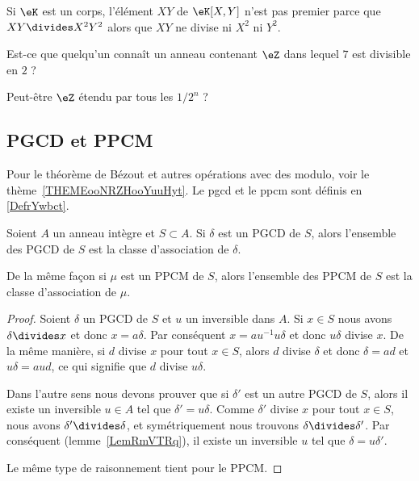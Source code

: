 \begin{example}
	Si \( \eK\) est un corps, l'élément \( XY\) de \( \eK[X,Y]\) n'est pas premier parce que \( XY\divides X^2Y^2\) alors que \( XY\) ne divise ni \( X^2\) ni \( Y^2\).
\end{example}

\begin{probleme}
	Est-ce que quelqu'un connaît un anneau contenant \( \eZ\) dans lequel \( 7\) est divisible en \( 2\) ?

	Peut-être \( \eZ\) étendu par tous les \( 1/2^n\) ?
\end{probleme}

\subsection{PGCD et PPCM}

Pour le théorème de Bézout et autres opérations avec des modulo, voir le thème~\ref{THEMEooNRZHooYuuHyt}. Le pgcd et le ppcm sont définis en \ref{DefrYwbct}.

\begin{lemma}
	Soient \( A\) un anneau intègre et \( S\subset A\). Si \( \delta\) est un PGCD de \( S\), alors l'ensemble des PGCD de \( S\) est la classe d'association de \( \delta\).

	De la même façon si \( \mu\) est un PPCM de \( S\), alors l'ensemble des PPCM de \( S\) est la classe d'association de \( \mu\).
\end{lemma}

\begin{proof}
	Soient \( \delta\) un PGCD de \( S\) et \( u\) un inversible dans \( A\). Si \( x\in S\) nous avons \( \delta\divides x\) et donc \( x=a\delta\). Par conséquent \( x=au^{-1}u\delta\) et donc \( u\delta\) divise \( x\). De la même manière, si \( d\) divise \( x\) pour tout \( x\in S\), alors \( d\) divise \( \delta\) et donc \( \delta=ad\) et \( u\delta=aud\), ce qui signifie que \( d\) divise \( u\delta\).

	Dans l'autre sens nous devons prouver que si \( \delta'\) est un autre PGCD de \( S\), alors il existe un inversible \( u\in A\) tel que \( \delta'=u\delta\). Comme \( \delta'\) divise \( x\) pour tout \( x\in S\), nous avons \( \delta'\divides \delta\), et symétriquement nous trouvons \( \delta\divides\delta'\). Par conséquent (lemme~\ref{LemRmVTRq}), il existe un inversible \( u\) tel que \( \delta=u\delta'\).

	Le même type de raisonnement tient pour le PPCM.
\end{proof}

